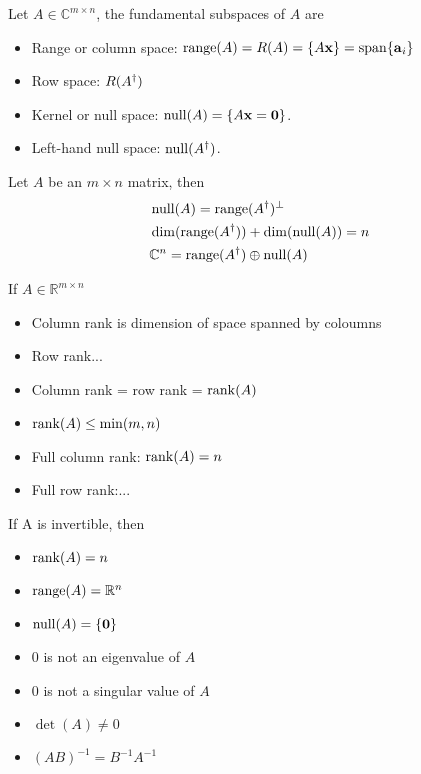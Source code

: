 \documentclass{article}
\begin{document}
\begin{definition}
    Let $A\in\mathbb{C}^{m\times n}$, the fundamental subspaces of $A$ are
    \begin{itemize}
        \item Range or column space: $\operatorname{range}(A)=R(A)=\{A\bm{\mathrm{x}}\}=\operatorname{span}\{ \bm{\mathrm{a}}_i \}$
        \item Row space: $R(A^{\dagger})$
        \item Kernel or null space: $\operatorname{null}(A)=\{ A\bm{\mathrm{x}}=\bm{\mathrm{0}} \}$. 
        \item Left-hand null space: $\operatorname{null}(A^{\dagger})$.
    \end{itemize}
\end{definition}

\begin{theorem}
    Let $A$ be an $m\times n$ matrix, then
    \begin{align}
        &\operatorname{null}(A)=\operatorname{range}(A^{\dagger})^{\perp}\\
        &\dim(\operatorname{range}(A^{\dagger}))+\dim(\operatorname{null}(A))=n\\
        &\mathbb{C}^n=\operatorname{range}(A^{\dagger})\oplus\operatorname{null}(A)
    \end{align}
\end{theorem}

\begin{definition}[Rank]
If $A\in\mathbb{R}^{m\times n}$
\begin{itemize}
    \item Column rank is dimension of space spanned by coloumns
    \item Row rank...
    \item Column rank = row rank = $\operatorname{rank}(A)$
    \item $\operatorname{rank}(A)\leq \min(m,n)$
    \item Full column rank: $\operatorname{rank}(A)=n$
    \item Full row rank:...
\end{itemize}
\end{definition}


\begin{definition}
If A is invertible, then
\begin{itemize}
    \item $\operatorname{rank}(A)=n$
    \item $\operatorname{range}(A)=\mathbb{R}^n$
    \item $\operatorname{null}(A)=\{\bm{\mathrm{0}}\}$
    \item $0$ is not an eigenvalue of $A$
    \item $0$ is not a singular value of $A$
    \item $\det(A)\neq 0$
    \item $(AB)^{-1}=B^{-1}A^{-1}$
\end{itemize}
\end{definition}
\end{document}
